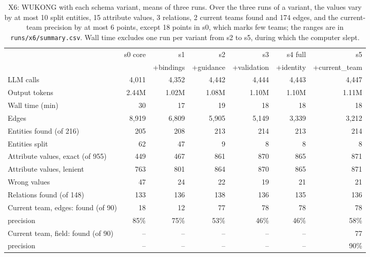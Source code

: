 \documentclass[11pt]{article}
\newcommand{\code}[1]{\texttt{#1}}
\newcommand{\wk}{WUKONG}
\begin{document}
\begin{table}[h]
\centering
\footnotesize
\setlength{\tabcolsep}{4pt}
\begin{tabular}{lrrrrrr}
\toprule
 & s0 core & s1 & s2 & s3 & s4 full & s5 \\
 & & +bindings & +guidance & +validation & +identity & +current\_team \\
\midrule
LLM calls & 4,011 & 4,352 & 4,442 & 4,444 & 4,443 & 4,447 \\
Output tokens & 2.44M & 1.02M & 1.08M & 1.10M & 1.10M & 1.11M \\
Wall time (min) & 30 & 17 & 19 & 18 & 18 & 18 \\
Edges & 8,919 & 6,809 & 5,905 & 5,149 & 3,339 & 3,212 \\
\midrule
Entities found (of 216) & 205 & 208 & 213 & 214 & 213 & 214 \\
Entities split & 62 & 47 & 9 & 8 & 8 & 8 \\
Attribute values, exact (of 955) & 449 & 467 & 861 & 870 & 865 & 871 \\
Attribute values, lenient & 763 & 801 & 864 & 870 & 865 & 871 \\
Wrong values & 47 & 24 & 22 & 19 & 21 & 21 \\
Relations found (of 148) & 133 & 136 & 138 & 136 & 135 & 136 \\
\midrule
Current team, edges: found (of 90) & 18 & 12 & 77 & 78 & 78 & 78 \\
\quad precision & 85\% & 75\% & 53\% & 46\% & 46\% & 58\% \\
Current team, field: found (of 90) & -- & -- & -- & -- & -- & 77 \\
\quad precision & -- & -- & -- & -- & -- & 90\% \\
\bottomrule
\end{tabular}
\caption{X6: \wk{} with each schema variant, means of three runs. Over the three runs of a variant,
the values vary by at most 10 split entities, 15 attribute values, 3 relations, 2 current teams
found and 174 edges, and the current-team precision by at most 6 points, except 18 points in s0,
which marks few teams; the ranges are in \code{runs/x6/summary.csv}. Wall time excludes one run per variant from s2 to s5, during which the
computer slept.}
\label{tab:x6}
\end{table}
\end{document}
